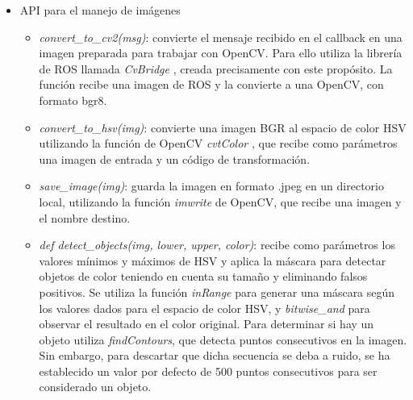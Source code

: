 \documentclass[12pt,spanish,chapterprefix, numbers=noenddot]{book}
\numberwithin{equation}{section}
\numberwithin{figure}{section}
\begin{document}
\begin{itemize}
\item{API para el manejo de imágenes}
    \begin{itemize}
    \item \textit{convert\_to\_cv2(msg)}: convierte el mensaje recibido en el callback en una imagen preparada para trabajar con OpenCV. Para ello utiliza la librería de ROS llamada \textit{CvBridge} \cite{cvbridge}, creada precisamente con este propósito. La función recibe una imagen de ROS y la convierte a una OpenCV, con formato bgr8. 
    \item \textit{convert\_to\_hsv(img)}: convierte una imagen BGR al espacio de color HSV utilizando la función de OpenCV \textit{cvtColor} \cite{cv_imgTransformations}, que recibe como parámetros una imagen de entrada y un código de transformación. 
    \item \textit{save\_image(img)}: guarda la imagen en formato .jpeg en un directorio local, utilizando la función \textit{imwrite} de OpenCV, que recibe una imagen y el nombre destino. 
    \item \textit{def detect\_objects(img, lower, upper, color)}: recibe como parámetros los valores mínimos y máximos de HSV y aplica la máscara para detectar objetos de color teniendo en cuenta su tamaño y eliminando falsos positivos. 
    Se utiliza la función \textit{inRange} para generar una máscara según los valores dados para el espacio de color HSV, y \textit{bitwise\_and} para observar el resultado en el color original. 
    Para determinar si hay un objeto utiliza \textit{findContours}, que detecta puntos consecutivos en la imagen. Sin embargo, para descartar que dicha secuencia se deba a ruido, se ha establecido un valor por defecto de 500 puntos consecutivos para ser considerado un objeto. 
    \end{itemize}
    

\end{itemize}
\end{document}
